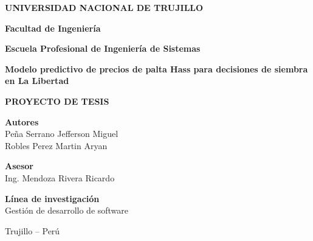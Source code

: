 ﻿%
\thispagestyle{empty}
\begin{singlespacing}
\begin{center}
  \vspace*{1.5cm}

  {\fontsize{18}{22}\selectfont\textbf{UNIVERSIDAD NACIONAL DE TRUJILLO}}

  \vspace{18pt}

  {\fontsize{14}{17}\selectfont\textbf{Facultad de Ingeniería}}

  \vspace{12pt}

  {\fontsize{12}{15}\selectfont\textbf{Escuela Profesional de Ingeniería de Sistemas}}

  \vspace{36pt}

  {\fontsize{12}{15}\selectfont\textbf{Modelo predictivo de precios de palta Hass para decisiones de siembra en La Libertad}}

  \vspace{24pt}

  {\fontsize{12}{15}\selectfont\textbf{PROYECTO DE TESIS}}

  \vspace{24pt}

  {\fontsize{12}{15}\selectfont
  \textbf{Autores}\\[6pt]
  Peña Serrano Jefferson Miguel\\[4pt]
  Robles Perez Martin Aryan}

  \vspace{18pt}

  {\fontsize{12}{15}\selectfont
  \textbf{Asesor}\\[6pt]
  Ing. Mendoza Rivera Ricardo}

  \vspace{18pt}

  {\fontsize{12}{15}\selectfont
  \textbf{Línea de investigación}\\[6pt]
  Gestión de desarrollo de software}

  \vspace{36pt}

  {\fontsize{12}{15}\selectfont Trujillo -- Perú}

  \vspace{6pt}

  {\fontsize{12}{15}}
\end{center}
\end{singlespacing}
\newpage
